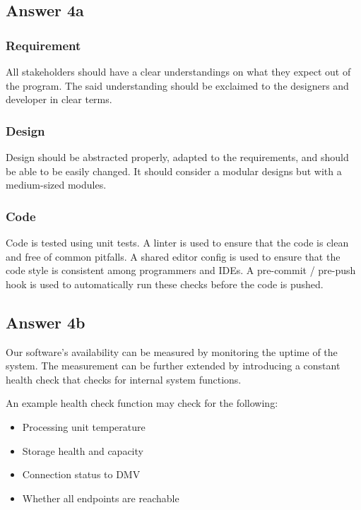 \documentclass[
  11pt, %
]{assignment}
\begin{document}
\subsection*{Answer 4a}

\subsubsection*{Requirement}

All stakeholders should have a clear understandings on what they expect out of the program. The said understanding should be exclaimed to the designers and developer in clear terms.

\subsubsection*{Design}

Design should be abstracted properly, adapted to the requirements, and should be able to be easily changed. It should consider a modular designs but with a medium-sized modules.

\subsubsection*{Code}

Code is tested using unit tests. A linter is used to ensure that the code is clean and free of common pitfalls. A shared editor config is used to ensure that the code style is consistent among programmers and IDEs\@. A pre-commit / pre-push hook is used to automatically run these checks before the code is pushed.

\subsection*{Answer 4b}

Our software's availability can be measured by monitoring the uptime of the system. The measurement can be further extended by introducing a constant health check that checks for internal system functions.

An example health check function may check for the following:
\begin{itemize}
  \item Processing unit temperature
  \item Storage health and capacity
  \item Connection status to DMV
  \item Whether all endpoints are reachable
\end{itemize}
\end{document}
